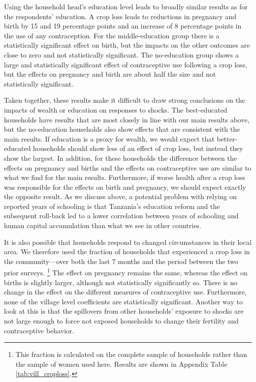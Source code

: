 \documentclass[letterpaper,12pt]{article}
\begin{document}
Using the household head's education level leads to broadly 
similar results as for the respondents' education. 
A crop loss leads to reductions in pregnancy and birth by
15 and 19 percentage points and an increase of 8 percentage points
in the use of any contraception.
For the middle-education group there is a statistically significant
effect on birth, but the impacts on the other outcomes are close to zero and
not statistically significant.
The no-education group shows a large and statistically significant
effect of contraceptive use following a crop loss, but the
effects on pregnancy and birth are about half the size and
not statistically significant.

Taken together, these results make it difficult to draw strong
conclusions on the impacts of wealth or education on responses to shocks.
The best-educated households have results that are
most closely in line with our main results above, but 
the no-education households also show effects that are
consistent with the main results.
If education is a proxy for wealth, we would 
expect that better-educated households should show less
of an effect of crop loss, but instead they show the largest.
In addition, for these households the difference between
the effects on pregnancy and births and the effects on
contraceptive use are similar to what we find for the main results.
Furthermore, if worse health after a crop loss was responsible for the
effects on birth and pregnancy, we should expect exactly
the opposite result.
As we discuss above, a potential problem with relying on 
reported years of schooling is that Tanzania's education reform and the
subsequent roll-back led to a lower correlation between years of
schooling and human capital accumulation than what we see in other
countries.


It is also possible that households respond to changed circumstances
in their local area.
We therefore used the fraction of households that experienced a crop
loss in the community---over both the last 7 months and the period 
between the two prior surveys.%
\footnote{
This fraction is calculated on the complete sample of households
rather than the sample of women used here.
Results are shown in Appendix Table \ref{tab:vill_croploss}.
}
The effect on pregnancy remains the same, whereas the effect on
births is slightly larger, although not statistically significantly so.
There is no change in the effect on the different measures of
contraceptive use.
Furthermore, none of the village level coefficients are statistically 
significant.
Another way to look at this is that the spillovers from other
households' exposure to shocks are not large enough to force 
not exposed households to change their fertility and contraceptive
behavior.
\end{document}
